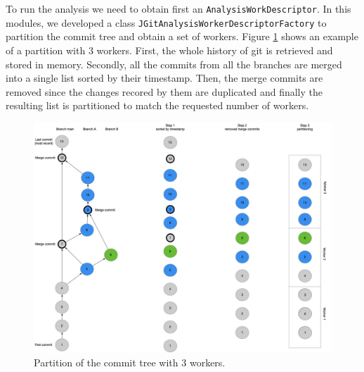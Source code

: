 To run the analysis we need to obtain first an \texttt{AnalysisWorkDescriptor}. 
In this modules, we developed a class \texttt{JGitAnalysisWorkerDescriptorFactory} to partition the commit tree and obtain a set of workers. 
Figure \ref{fig:historysplit} shows an example of a partition with 3 workers. First, the whole history of git is retrieved and stored in memory. Secondly, all the commits from all the branches are merged into a single list sorted by their timestamp. 
Then, the merge commits are removed since the changes recored by them are duplicated and finally the resulting list is partitioned to match the requested number of workers. 
\begin{figure}
    \center
    \includegraphics[width=\textwidth]{HistorySplit.jpg}
    \caption{Partition of the commit tree with 3 workers.}
    \label{fig:historysplit}
\end{figure}


